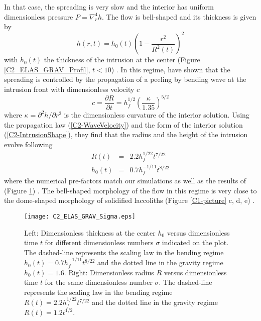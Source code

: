 In that case, the spreading is  very slow and the interior has uniform
dimensionless pressure $P =\nabla_r^4h$.   The flow is bell-shaped and
its thickness is given by
\begin{equation}
  h(r,t) = h_0(t)\left(1-\frac{r^2}{R^2(t)}\right)^2
  \label{C2-IntrusionShape}
\end{equation}
with $h_0(t)$  the thickness  of the intrusion  at the  center (Figure
\ref{C2_ELAS_GRAV_Profil},                                     $t<10$)
\citep{Michaut:2011kg,Lister:2013ia}.       In       this      regime,
\citet{Lister:2013ia} have  shown that the spreading  is controlled by
the propagation  of a peeling by  bending wave at the  intrusion front
with dimensionless velocity $c$
\begin{equation}
  c=    \frac{\partial             R}{\partial            t}             =h_f^{1/2}
  \left(\frac{\kappa}{1.35}\right)^{5/2}
  \label{C2-WaveVelocity}
\end{equation}
where  $\kappa  =  \partial^2  h/\partial r^2$  is  the  dimensionless
curvature  of  the  interior  solution.   Using  the  propagation  law
(\ref{C2-WaveVelocity})  and   the  form  of  the   interior  solution
(\ref{C2-IntrusionShape}), they find that the radius and the height of
the intrusion evolve following
\begin{eqnarray}
  R(t) &=& 2.2h_f^{1/22}t^{7/22}\label{C2-ScalingR}\\
  h_0(t)&=&0.7 h_f^{-1/11}t^{8/22}\label{C2-ScalingH}
\end{eqnarray}
where the numerical  pre-factors match our simulations as  well as the
results  of  \citet{Lister:2013ia}  (Figure  \ref{C2_ELAS_GRAV_Sigma})
. The bell-shaped morphology of the  flow in this regime is very close
to  the  dome-shaped  morphology   of  solidified  laccoliths  (Figure
\ref{C1-picture} c, d, e) \citep{Michaut:2011kg}.

\begin{figure}[h!]
  \begin{center}
    \graphicspath{ {/Users/thorey/Documents/These/Manuscript/Figure/Chapter2/} }
    \texttt{[image: C2\_ELAS\_GRAV\_Sigma.eps]}
    \caption{Left: Dimensionless thickness at  the center $h_0$ versus
      dimensionless  time  $t$  for  different  dimensionless  numbers
      $\sigma$ indicated on the  plot.  The dashed-line represents the
      scaling       law       in        the       bending       regime
      $h_0(t)=0.7  h_f^{-1/11}t^{8/22}$ and  the  dotted  line in  the
      gravity regime $h_0(t) =  1.6$.  Right: Dimensionless radius $R$
      versus dimensionless time $t$  for the same dimensionless number
      $\sigma$.   The dashed-line  represents the  scaling law  in the
      bending  regime $R(t)  = 2.2h_f^{1/22}t^{7/22}$  and the  dotted
      line in the gravity regime $R(t) = 1.2t^{1/2}$.}
    \label{C2_ELAS_GRAV_Sigma}
  \end{center}
\end{figure}

